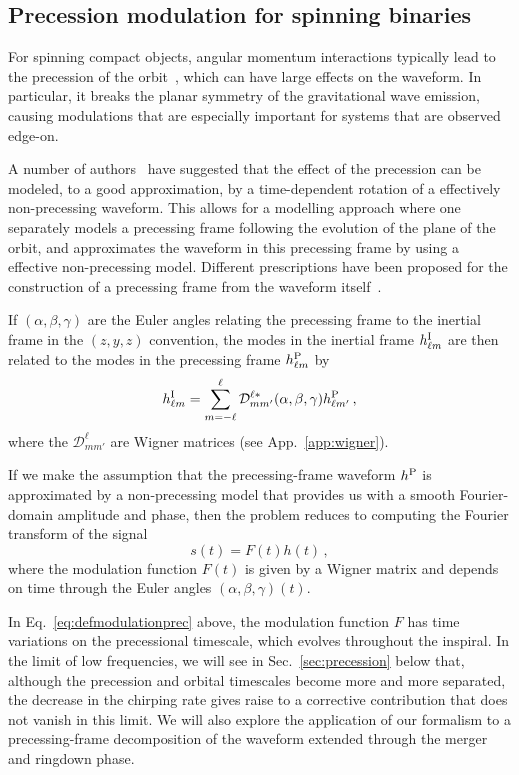 \documentclass[aps,showpacs,twocolumn,
prd,superscriptaddress,nofootinbib]{revtex4-1}
\newcommand{\be}{\begin{equation}}
\newcommand{\ee}{\end{equation}}
\newcommand\calD{{\mathcal{D}}}
\begin{document}

\subsection{Precession modulation for spinning binaries}
\label{subsec:modulationPrec}

For spinning compact objects, angular momentum interactions typically lead to the precession of the orbit~\cite{Apostolatos+94, Kidder95}, which can have large effects on the waveform. In particular, it breaks the planar symmetry of the gravitational wave emission, causing modulations that are especially important for systems that are observed edge-on.

A number of authors~\cite{BCV03b, BCPTV05, Schmidt+10, OShaughnessy+11, Boyle+11} have suggested that the effect of the precession can be modeled, to a good approximation, by a time-dependent rotation of a effectively non-precessing waveform. This allows for a modelling approach where one separately models a precessing frame following the evolution of the plane of the orbit, and approximates the waveform in this precessing frame by using a effective non-precessing model. Different prescriptions have been proposed for the construction of a precessing frame from the waveform itself~\cite{Schmidt+10, OShaughnessy+11, Boyle+11}.

If $(\alpha, \beta, \gamma)$ are the Euler angles relating the precessing frame to the inertial frame in the $(z,y,z)$ convention, the modes in the inertial frame $h_{\ell m}^{\rm I}$ are then related to the modes in the precessing frame $h_{\ell m}^{\rm P}$ by~\cite{Goldberg+67}
\be\label{eq:wignerrotintro}
	h_{\ell m}^{\rm I} = \sum\limits_{m=-\ell}^{\ell} \calD^{\ell *}_{mm'} (\alpha,\beta,\gamma) h_{\ell m'}^{\rm P} \,,
\ee
where the $\calD^{\ell}_{mm'}$ are Wigner matrices (see App.~\ref{app:wigner}).

If we make the assumption that the precessing-frame waveform $h^{\rm P}$ is approximated by a non-precessing model that provides us with a smooth Fourier-domain amplitude and phase, then the problem reduces to computing the Fourier transform of the signal
\be\label{eq:defmodulationprec}
	s(t) = F(t) h(t) \,,
\ee
where the modulation function $F(t)$ is given by a Wigner matrix and depends on time through the Euler angles $(\alpha, \beta, \gamma)(t)$.

In Eq.~\eqref{eq:defmodulationprec} above, the modulation function $F$ has time variations on the precessional timescale, which evolves throughout the inspiral. In the limit of low frequencies, we will see in Sec.~\ref{sec:precession} below that, although the precession and orbital timescales become more and more separated, the decrease in the chirping rate gives raise to a corrective contribution that does not vanish in this limit. We will also explore  the application of our formalism to a precessing-frame decomposition of the waveform extended through the merger and ringdown phase.
\end{document}
